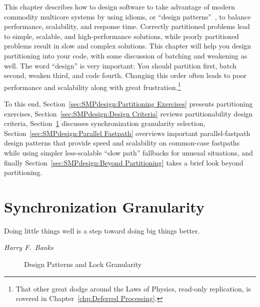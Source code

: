
%

This chapter describes how to design software to take advantage of
modern commodity multicore systems by using idioms, or
``design patterns''~\cite{Alexander79,GOF95,SchmidtStalRohnertBuschmann2000v2Textbook},
to balance performance, scalability, and response time.
Correctly partitioned problems lead to simple, scalable, and
high-performance solutions, while poorly partitioned problems result
in slow and complex solutions.
This chapter will help you design partitioning into your code, with
some discussion of batching and weakening as well.
The word ``design'' is very important: You should partition first,
batch second, weaken third, and code fourth.
Changing this order often leads to poor performance and scalability
along with great frustration.\footnote{
	That other great dodge around the Laws of Physics, read-only
	replication, is covered in Chapter~\ref{chp:Deferred Processing}.}

To this end, Section~\ref{sec:SMPdesign:Partitioning Exercises}
presents partitioning exercises,
Section~\ref{sec:SMPdesign:Design Criteria} reviews partitionability
design criteria,
Section~\ref{sec:SMPdesign:Synchronization Granularity}
discusses synchronization granularity selection,
Section~\ref{sec:SMPdesign:Parallel Fastpath}
overviews important parallel-fastpath design patterns
that provide speed and scalability on common-case fastpaths while using
simpler less-scalable ``slow path'' fallbacks for unusual situations,
and finally
Section~\ref{sec:SMPdesign:Beyond Partitioning}
takes a brief look beyond partitioning.





\section{Synchronization Granularity}
\label{sec:SMPdesign:Synchronization Granularity}
%
\epigraph{Doing little things well is a step toward doing big things better.}
	 {\emph{Harry F.~Banks}}

\begin{figure}[tb]
\centering
{}
\caption{Design Patterns and Lock Granularity}
\label{fig:SMPdesign:Design Patterns and Lock Granularity}
\end{figure}


